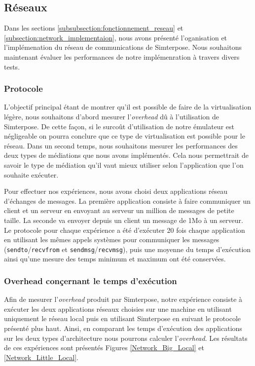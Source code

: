\subsection{Réseaux}
\label{subsection:res}

Dans les sections \ref{subsubsection:fonctionnement_reseau} et \ref{subsection:network_implementaion}, nous avons présenté l'oganisation et l'implémenation du réseau de communications de Simterpose. Nous souhaitons maintenant évaluer les performances de notre implémenration à travers divers tests.

\subsubsection{Protocole}
L'objectif principal étant de montrer qu'il est possible de faire de la virtualisation légère, nous souhaitons d'abord mesurer l'\textit{overhead} dû à l'utilisation de Simterpose. De cette façon, si le surcoût d'utilisation de notre émulateur est négligeable on pourra conclure que ce type de virtualisation est possible pour le réseau. Dans un second temps, nous souhaitons mesurer les performances des deux types de médiations que nous avons implémentés. Cela nous permettrait de savoir le type de médiation qu'il vaut mieux utiliser selon l'application que l'on souhaite exécuter.

Pour effectuer nos expériences, nous avons choisi deux applications réseau d'échanges de messages. La première application consiste à faire communiquer un client et un serveur en envoyant au serveur un million de messages de petite taille. La seconde va envoyer depuis un client un message de 1Mo à un serveur. Le protocole pour chaque expérience a été d'exécuter 20 fois chaque application en utilisant les mêmes appels systèmes pour communiquer les messages (\texttt{sendto}/\texttt{recvfrom} et \texttt{sendmsg}/\texttt{recvmsg}), puis une moyenne du temps d'exécution ainsi qu'une mesure des temps minimum et maximum ont été conservées.

\subsubsection{Overhead conçernant le temps d'exécution}
Afin de mesurer l'\textit{overhead} produit par Simterpose, notre expérience consiste à exécuter les deux applications réseaux choisies sur une machine en utilisant uniquement le réseau local puis en utilisant Simterpose en suivant le protocole présenté plus haut. Ainsi, en comparant les temps d'exécution des applications sur les deux types d'architecture nous pourrons calculer l'\textit{overhead}. Les résultats de ces expériences sont présentés Figures \ref{Network_Big_Local} et \ref{Network_Little_Local}.

